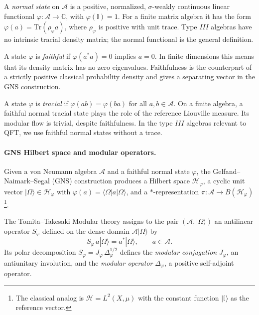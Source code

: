 \documentclass[a4paper,11pt]{article}
\theoremstyle{definition}
\newcommand{\id}{\mathbb{I}}
\newcommand{\Tr}{\text{Tr}}
\begin{document}
A \emph{normal state} on $\mathcal{A}$ is a positive, normalized, $\sigma$-weakly continuous
linear functional $\varphi:\mathcal{A}\to\mathbb{C}$, with $\varphi(\id)=1$.
For a finite matrix algebra it has the form $\varphi(a)=\Tr(\rho_\varphi a)$,
where $\rho_\varphi$ is positive with unit trace. Type $III$ algebras have no
intrinsic tracial density matrix; the normal functional is the general definition.

A state $\varphi$ is \emph{faithful} if $\varphi(a^*a)=0$ implies $a=0$.
In finite dimensions this means that its density matrix has no zero eigenvalues.
Faithfulness is the counterpart of a strictly positive classical probability density
and gives a separating vector in the GNS construction.

A state $\varphi$ is \emph{tracial} if $\varphi(ab)=\varphi(ba)$ for all $a,b\in\mathcal{A}$.
On a finite algebra, a faithful normal tracial state plays the role of the reference
Liouville measure. Its modular flow is trivial, despite faithfulness. In the type $III$
algebras relevant to QFT, we use faithful normal states without a trace.

\paragraph{GNS Hilbert space and modular operators.}
Given a von Neumann algebra $\mathcal{A}$ and a faithful normal state $\varphi$, the
Gelfand--Naimark--Segal (GNS) construction produces a Hilbert space $\mathcal{H}_\varphi$,
a cyclic unit vector $|\Omega\rangle\in\mathcal{H}_\varphi$ with
$\varphi(a)=\langle\Omega|a|\Omega\rangle$, and a $*$-representation
$\pi:\mathcal{A}\to B(\mathcal{H}_\varphi)$ \footnote{The classical analog is $\mathcal{H}=L^2(X,\mu)$
with the constant function $|\id\rangle$ as the reference vector.}.

The Tomita--Takesaki Modular theory assigns to the pair $(\mathcal{A},|\Omega\rangle)$ an
antilinear operator $S_\varphi$ defined on the dense domain
$\mathcal{A}|\Omega\rangle$ by
\begin{equation}
  S_\varphi\, a|\Omega\rangle = a^*|\Omega\rangle, \qquad a\in\mathcal{A}.
  \label{eq:Tomita-S}
\end{equation}
Its polar decomposition $S_\varphi = J_\varphi\,\Delta_\varphi^{1/2}$ defines the
\emph{modular conjugation} $J_\varphi$, an antiunitary involution, and the
\emph{modular operator} $\Delta_\varphi$, a positive self-adjoint operator. 

\end{document}
